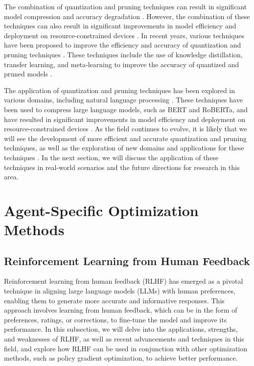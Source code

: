 \documentclass[11pt]{article}
\begin{document}
The combination of quantization and pruning techniques can result in significant model compression and accuracy degradation \cite{ref147}. However, the combination of these techniques can also result in significant improvements in model efficiency and deployment on resource-constrained devices \cite{ref148}. In recent years, various techniques have been proposed to improve the efficiency and accuracy of quantization and pruning techniques \cite{ref149}. These techniques include the use of knowledge distillation, transfer learning, and meta-learning to improve the accuracy of quantized and pruned models \cite{ref150}.

The application of quantization and pruning techniques has been explored in various domains, including natural language processing \cite{ref151}. These techniques have been used to compress large language models, such as BERT and RoBERTa, and have resulted in significant improvements in model efficiency and deployment on resource-constrained devices \cite{ref152}. As the field continues to evolve, it is likely that we will see the development of more efficient and accurate quantization and pruning techniques, as well as the exploration of new domains and applications for these techniques \cite{ref153}. In the next section, we will discuss the application of these techniques in real-world scenarios and the future directions for research in this area.

\section{Agent-Specific Optimization Methods}

\subsection{Reinforcement Learning from Human Feedback}

Reinforcement learning from human feedback (RLHF) has emerged as a pivotal technique in aligning large language models (LLMs) with human preferences, enabling them to generate more accurate and informative responses. This approach involves learning from human feedback, which can be in the form of preferences, ratings, or corrections, to fine-tune the model and improve its performance. In this subsection, we will delve into the applications, strengths, and weaknesses of RLHF, as well as recent advancements and techniques in this field, and explore how RLHF can be used in conjunction with other optimization methods, such as policy gradient optimization, to achieve better performance.
\end{document}
